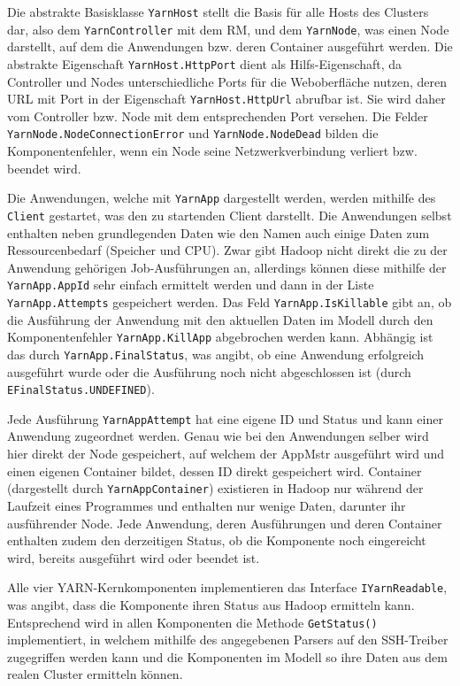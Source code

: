 Die abstrakte Basisklasse \texttt{YarnHost} stellt die Basis für alle Hosts des Clusters dar, also dem \texttt{YarnController} mit dem \ac{RM}, und dem \texttt{YarnNode}, was einen Node darstellt, auf dem die Anwendungen bzw. deren Container ausgeführt werden. Die abstrakte Eigenschaft \texttt{YarnHost.HttpPort} dient als Hilfs-Eigenschaft, da Controller und Nodes unterschiedliche Ports für die Weboberfläche nutzen, deren URL mit Port in der Eigenschaft \texttt{YarnHost.HttpUrl} abrufbar ist. Sie wird daher vom Controller bzw. Node mit dem entsprechenden Port versehen. Die Felder \texttt{YarnNode.NodeConnectionError} und \texttt{YarnNode.NodeDead} bilden die Komponentenfehler, wenn ein Node seine Netzwerkverbindung verliert bzw. beendet wird.

Die Anwendungen, welche mit \texttt{YarnApp} dargestellt werden, werden mithilfe des \texttt{Client} gestartet, was den zu startenden Client darstellt. Die Anwendungen selbst enthalten neben grundlegenden Daten wie \zB den Namen auch einige Daten zum Ressourcenbedarf (Speicher und CPU). Zwar gibt Hadoop nicht direkt die zu der Anwendung gehörigen Job-Ausführungen an, allerdings können diese mithilfe der \texttt{YarnApp.AppId} sehr einfach ermittelt werden und dann in der Liste \texttt{YarnApp.Attempts} gespeichert werden. Das Feld \texttt{YarnApp.IsKillable} gibt an, ob die Ausführung der Anwendung mit den aktuellen Daten im Modell durch den Komponentenfehler \texttt{YarnApp.KillApp} abgebrochen werden kann. Abhängig ist das durch \texttt{YarnApp.FinalStatus}, was angibt, ob eine Anwendung erfolgreich ausgeführt wurde oder die Ausführung noch nicht abgeschlossen ist (durch \texttt{EFinalStatus.UNDEFINED}).

Jede Ausführung \texttt{YarnAppAttempt} hat eine eigene ID und Status und kann einer Anwendung zugeordnet werden. Genau wie bei den Anwendungen selber wird hier direkt der Node gespeichert, auf welchem der \ac{AppMstr} ausgeführt wird und einen eigenen Container bildet, dessen ID direkt gespeichert wird. Container (dargestellt durch \texttt{YarnAppContainer}) existieren in Hadoop nur während der Laufzeit eines Programmes und enthalten nur wenige Daten, darunter ihr ausführender Node. Jede Anwendung, deren Ausführungen und deren Container enthalten zudem den derzeitigen Status, ob die Komponente noch eingereicht wird, bereits ausgeführt wird oder beendet ist.

Alle vier YARN-Kernkomponenten implementieren das Interface \texttt{IYarnReadable}, was angibt, dass die Komponente ihren Status aus Hadoop ermitteln kann. Entsprechend wird in allen Komponenten die Methode \texttt{GetStatus()} implementiert, in welchem mithilfe des angegebenen Parsers auf den SSH-Treiber zugegriffen werden kann und die Komponenten im Modell so ihre Daten aus dem realen Cluster ermitteln können.